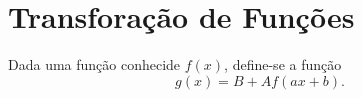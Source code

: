 
\section{Transforação de Funções}
\label{sec:transforação_de_funções}

Dada uma função conhecide $f(x)$, define-se a função \[
	g(x) = B + Af(ax+b)
.\] 
